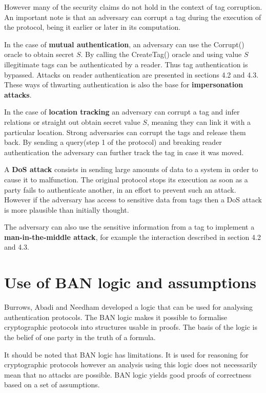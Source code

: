     However many of the security claims do not hold in the context of tag corruption. An important note is that an adversary can corrupt
    a tag during the execution of the protocol, being it earlier or later in its computation.

    In the case of \textbf{mutual authentication}, an adversary can use the Corrupt() oracle to obtain secret $S$. By calling the CreateTag()
    oracle and using value $S$ illegitimate tags can be authenticated by a reader. Thus tag authentication is bypassed. Attacks on reader 
    authentication are presented in sections 4.2 and 4.3. These ways of thwarting authentication is also the base for 
    \textbf{impersonation attacks}.
    
    In the case of \textbf{location tracking} an adversary can corrupt a tag and infer relations or straight out obtain secret value $S$, meaning
    they can link it with a particular location. Strong adversaries can corrupt the tags and release them back. By sending a query(step 1
    of the protocol) and breaking reader authentication the adversary can further track the tag in case it was moved.

    A \textbf{DoS attack} consists in sending large amounts of data to a system in order to cause it to malfunction. The original protocol
    stops its execution as soon as a party fails to authenticate another, in an effort to prevent such an attack. However if the adversary 
    has access to sensitive data from tags then a DoS attack is more plausible than initially thought.

    The adversary can also use the sensitive information from a tag to implement a \textbf{man-in-the-middle attack}, for example the 
    interaction described in section 4.2 and 4.3.

\section{Use of BAN logic and assumptions}
    Burrows, Abadi and Needham developed a logic that can be used for analysing authentication protocols. The BAN logic makes it possible
    to formalise cryptographic protocols into structures usable in proofs. The basis of the logic is the belief of one party in the truth
    of a formula. 

    It should be noted that BAN logic has limitations. It is used for reasoning for cryptographic protocols however an analysis using this
    logic does not necessarily mean that no attacks are possible. BAN logic yields good proofs of correctness based on a set of assumptions.

